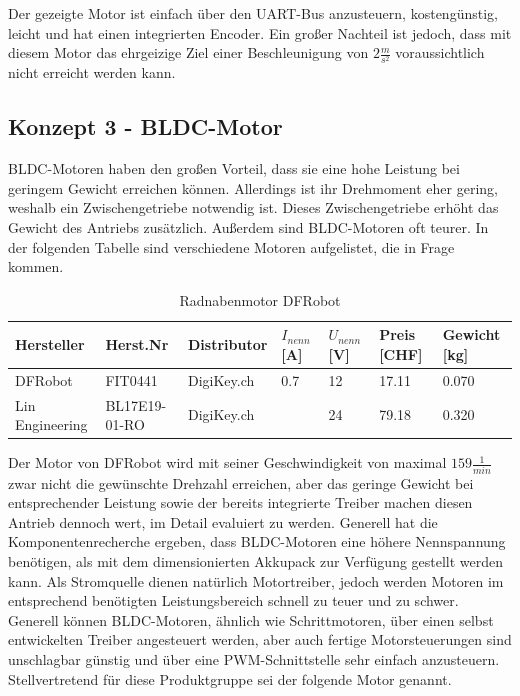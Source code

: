 \documentclass[main.  tex]{subfiles} %
\begin{document}
Der gezeigte Motor ist einfach über den UART-Bus anzusteuern, kostengünstig,
leicht und hat einen integrierten Encoder. Ein großer Nachteil ist jedoch, dass
mit diesem Motor das ehrgeizige Ziel einer Beschleunigung von $2 \frac{m}{s^2}$
voraussichtlich nicht erreicht werden kann.

\subsection*{Konzept 3 - BLDC-Motor} %

BLDC-Motoren haben den großen Vorteil, dass sie eine hohe Leistung bei geringem
Gewicht erreichen können. Allerdings ist ihr Drehmoment eher gering, weshalb
ein Zwischengetriebe notwendig ist. Dieses Zwischengetriebe erhöht das Gewicht
des Antriebs zusätzlich. Außerdem sind BLDC-Motoren oft teurer. In der
folgenden Tabelle sind verschiedene Motoren aufgelistet, die in Frage kommen.

\begin{table}[h]
    \centering
    \begin{tabular}{|p{2cm}|p{3cm}|p{2cm}|p{1cm}|p{1cm}|p{1cm}|p{1.5cm}|}
        \hline
        Hersteller      & Herst.Nr    & Distributor  & $I_{nenn} $ [A] & $U_{nenn}$ [V] & Preis [CHF] & Gewicht [kg] \\ \hline
        DFRobot         & FIT0441       & DigiKey.ch & 0.7           & 12             & 17.11     & 0.070      \\ \hline
        Lin Engineering & BL17E19-01-RO & DigiKey.ch &                 & 24             & 79.18     & 0.320      \\ \hline
    \end{tabular}
    \caption{Radnabenmotor DFRobot}
\end{table}

Der Motor von DFRobot wird mit seiner Geschwindigkeit von maximal $159
    \frac{1}{min}$ zwar nicht die gewünschte Drehzahl erreichen, aber das geringe
Gewicht bei entsprechender Leistung sowie der bereits integrierte Treiber
machen diesen Antrieb dennoch wert, im Detail evaluiert zu werden. Generell hat
die Komponentenrecherche ergeben, dass BLDC-Motoren eine höhere Nennspannung
benötigen, als mit dem dimensionierten Akkupack zur Verfügung gestellt werden
kann. Als Stromquelle dienen natürlich Motortreiber, jedoch werden Motoren im
entsprechend benötigten Leistungsbereich schnell zu teuer und zu schwer.
Generell können BLDC-Motoren, ähnlich wie Schrittmotoren, über einen selbst
entwickelten Treiber angesteuert werden, aber auch fertige Motorsteuerungen
sind unschlagbar günstig und über eine PWM-Schnittstelle sehr einfach
anzusteuern. Stellvertretend für diese Produktgruppe sei der folgende Motor
genannt.
\end{document}

